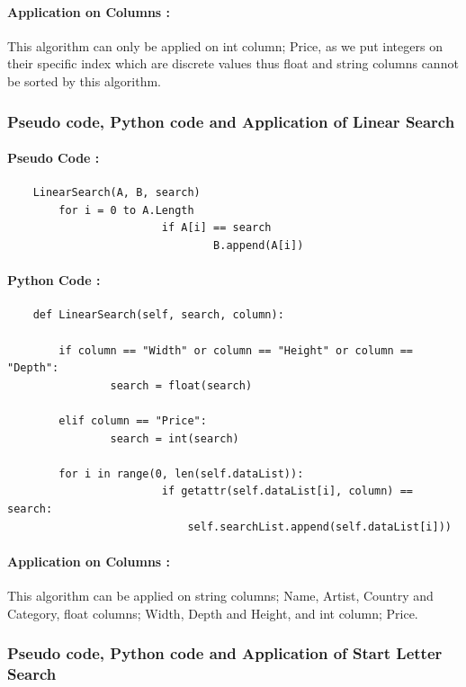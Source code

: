 \documentclass[12pt]{article}
\begin{document}
    \paragraph{Application on Columns :} 
     This algorithm can only be applied on int column; Price, as we put integers on their specific index which are discrete values thus float and string columns cannot be sorted by this algorithm.
    
    \newpage
    \subsubsection{Pseudo code, Python code and Application of Linear Search}
    \paragraph{Pseudo Code :}
    \begin{verbatim}
    LinearSearch(A, B, search)
        for i = 0 to A.Length
                        if A[i] == search
                                B.append(A[i])
    \end{verbatim}
    \paragraph{Python Code :}
    \begin{verbatim}
    def LinearSearch(self, search, column):

        if column == "Width" or column == "Height" or column == "Depth":
                search = float(search)

        elif column == "Price":
                search = int(search)

        for i in range(0, len(self.dataList)):
                        if getattr(self.dataList[i], column) == search:
                            self.searchList.append(self.dataList[i]))
    \end{verbatim}
    \paragraph{Application on Columns :} 
    This algorithm can be applied on string columns; Name, Artist, Country and Category, float columns; Width, Depth and Height, and int column; Price.
    
    \newpage
    \subsubsection{Pseudo code, Python code and Application of Start Letter Search}
\end{document}
